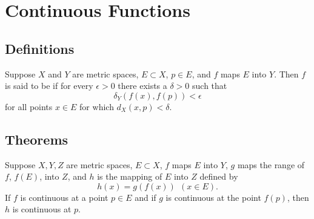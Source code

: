 \section{Continuous Functions}
\subsection{Definitions}
\begin{deff}\label{def:function continuous}
	Suppose $X$ and $Y$ are metric spaces, $E \subset X$, $p \in E$, and $f$ maps $E$ into $Y$. Then $f$ is said to be {}  if for every $\epsilon > 0$ there exists a $\delta >0 $ such that $$\delta_Y(f(x),f(p)) < \epsilon$$ for all points $x \in E$ for which $d_X(x,p) < \delta.$
\end{deff}

\subsection{Theorems}

\begin{thm}
	Suppose $X, Y, Z$ are metric spaces, $E \subset X$, $f$ maps $E$ into $Y$, $g$ maps the range of $f$, $f(E)$, into $Z$, and $h$ is the mapping of $E$ into $Z$ defined by $$h(x) = g(f(x)) ~ ~ (x \in E).$$ If $f$ is continuous at a point $p \in E$ and if $g$ is continuous at the point $f(p)$, then $h$ is continuous at $p$.
\end{thm}




